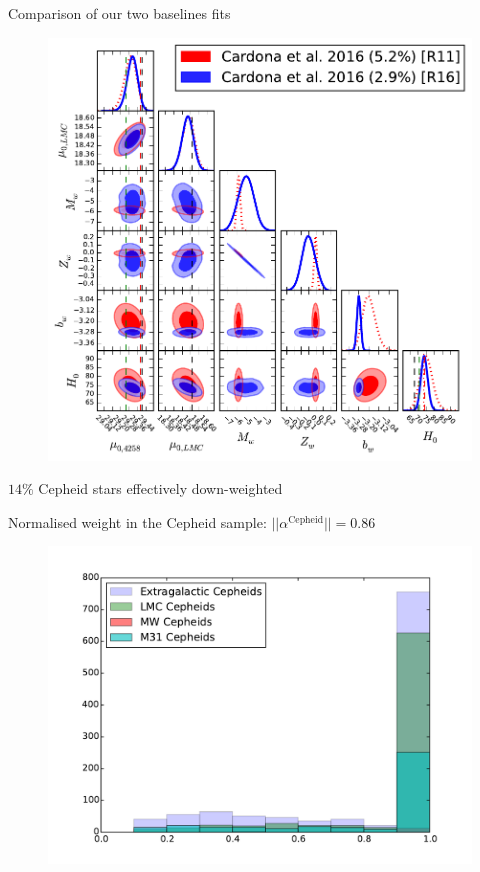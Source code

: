 \documentclass{beamer}
\newcommand{\Cepheid}{\mathrm{Cepheid}}
\begin{document}
\begin{frame}{Comparison of our two baselines fits}
\begin{figure}
\includegraphics[scale=0.5]{../figures/chapter-h0/triangle_plot_fit_29_44.pdf} 
\end{figure}
\end{frame}

\begin{frame}{$14\%$ Cepheid stars effectively down-weighted}
\begin{center}
Normalised weight in the Cepheid sample: $|| \alpha^{\Cepheid}|| = 0.86$
\end{center}
\begin{figure}
\includegraphics[scale=0.4]{../figures/chapter-h0/effective_HP_histogram_R16.pdf} 
\end{figure}
\end{frame}
\end{document}
